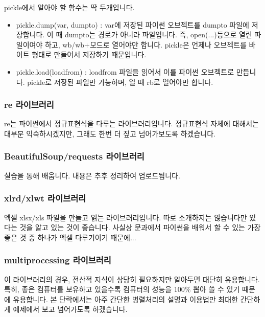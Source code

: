 \documentclass[twoside]{article}
\begin{document}
pickle에서 알아야 할 함수는 딱 두개입니다.

\begin{itemize} 
\item pickle.dump(var, dumpto) : var에 저장된 파이썬 오브젝트를 dumpto 파일에 저장합니다. 이 때 dumpto는 경로가 아니라 파일입니다. 즉, open(...)등으로 열린 파일이여야 하고, wb/wb+모드로 열어야만 합니다. pickle은 언제나 오브젝트를 바이트 형태로 만들어서 저장하기 때문입니다. 
\item pickle.load(loadfrom) : loadfrom 파일을 읽어서 이를 파이썬 오브젝트로 만듭니다. pickle로 저장된 파일만 가능하며, 열 때 rb로 열어야만 합니다. 
\end{itemize}



\subsubsection{re 라이브러리} 

re는 파이썬에서 정규표현식을 다루는 라이브러리입니다. 정규표현식 자체에 대해서는 대부분 익숙하시겠지만, 그래도 한번 더 짚고 넘어가보도록 하겠습니다. 

\subsubsection{BeautifulSoup/requests 라이브러리}

실습을 통해 배웁니다. 내용은 추후 정리하여 업로드됩니다. 

\subsubsection{xlrd/xlwt 라이브러리}

엑셀 xlsx/xls 파일을 만들고 읽는 라이브러리입니다. 따로 소개하지는 않습니다만 있다는 것을 알고 있는 것이 좋습니다. 사실상 문과에서 파이썬을 배워서 할 수 있는 가장 좋은 것 중 하나가 엑셀 다루기이기 때문에... 

\subsubsection{multiprocessing 라이브러리} 

이 라이브러리의 경우, 전산적 지식이 상당히 필요하지만 알아두면 대단히 유용합니다. 특히, 좋은 컴퓨터를 보유하고 있을수록 컴퓨터의 성능을 100\% 뽑아 쓸 수 있기 때문에 유용합니다. 본 단락에서는 아주 간단한 병렬처리의 설명과 이용법만 최대한 간단하게 예제에서 보고 넘어가도록 하겠습니다.
\end{document}
